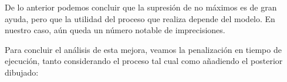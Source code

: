 \documentclass[11pt,a4paper]{article}
\begin{document}
\begin{figure}[H]
\begin{center}
{    					}

    				\end{center}

    			\end{figure}

\newpage

                \par
                De lo anterior podemos concluir que la supresión de no máximos es de gran ayuda, pero que la utilidad del proceso que realiza depende del modelo. En nuestro caso, aún queda un número notable de imprecisiones.

                \par
                Para concluir el análisis de esta mejora, veamos la penalización en tiempo de ejecución, tanto considerando el proceso tal cual como añadiendo el posterior dibujado:
\end{document}
